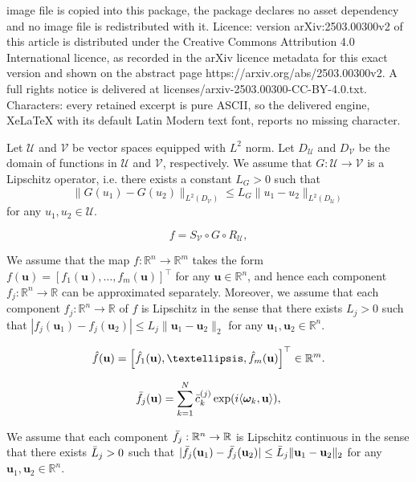 \documentclass[10pt,a4paper]{amsart}
\newcommand{\R}{\mathbb{R}}
\newcommand{\Uc}{\mathcal{U}}
\newcommand{\Vc}{\mathcal{V}}
\newcommand{\omegab}{\boldsymbol\omega}
\newcommand{\ub}{\mathbf{u}}
\begin{document}
image file is copied into this package, the package declares no asset dependency and no image file is redistributed with it. Licence: version arXiv:2503.00300v2 of this article is distributed under the Creative Commons Attribution 4.0 International licence, as recorded in the arXiv licence metadata for this exact version and shown on the abstract page https://arxiv.org/abs/2503.00300v2. A full rights notice is delivered at licenses/arxiv-2503.00300-CC-BY-4.0.txt. Characters: every retained excerpt is pure ASCII, so the delivered engine, XeLaTeX with its default Latin Modern text font, reports no missing character.
\begin{assumption}
\label{Assmps:Lipschitz_G}
Let $\Uc$ and $\Vc$ be vector spaces equipped with $L^2$ norm.
Let $D_\Uc$ and $D_\Vc$ be the domain of functions in $\Uc$ and $\Vc$, respectively. 
We assume that $G:\Uc\to\Vc$ is a Lipschitz operator, i.e. there exists a constant $L_G>0$ such that
\begin{equation*}
\|G(u_1) - G(u_2)\|_{L^2(D_\Vc)} \leq L_G \|u_1 - u_2\|_{L^2(D_\Uc)}
\end{equation*}
for any $u_1,u_2\in\Uc$.
\end{assumption}

\begin{equation}
\label{operator_f}
f = S_\Vc\circ G\circ R_\Uc,
\end{equation}

\begin{assumption}
\label{Assmps:f}
We assume that the map $f:\R^n\to\R^m$ takes the form $f(\ub) = [f_1(\ub),\dots, f_m(\ub)]^\top$ for any $\ub\in\R^n$, and hence each component $f_j:\R^n\to\R$ can be approximated separately. Moreover, we assume that each component $f_j:\R^n\to\R$ of $f$ is Lipschitz in the sense that there exists $L_j>0$ such that $|f_j(\ub_1) - f_j(\ub_2)| \leq L_j\|\ub_1 - \ub_2\|_2$ for any $\ub_1,\ub_2\in\R^n$.
\end{assumption}

\begin{equation}
\label{operator_rf}
\Hat{f}(\ub) = \left[ \Hat{f}_1(\ub), \dots, \Hat{f}_m(\ub)\right]^\top\in\R^m.
\end{equation}

\begin{equation}
\label{operator_temp}
\Bar{f}_j(\ub) = \sum_{k=1}^N \Bar{c}_k^{(j)} \exp(i\langle \omegab_k,\ub\rangle),
\end{equation}

\begin{assumption}
\label{Assmps:Lipschitz_f_bar}
We assume that each component $\Bar{f}_j:\R^n\to\R$ is Lipschitz continuous in the sense that there exists $\Bar{L}_j>0$ such that $|\Bar{f}_j(\ub_1) - \Bar{f}_j(\ub_2)| \leq \Bar{L}_j\|\ub_1 - \ub_2\|_2$ for any $\ub_1,\ub_2\in\R^n$.
\end{assumption}
\end{document}

